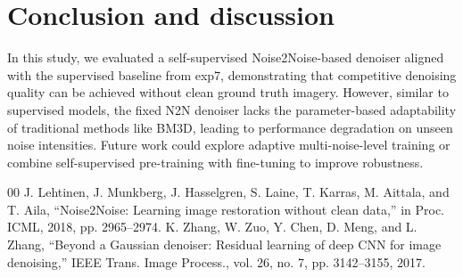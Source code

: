 \documentclass[conference]{IEEEtran}
\begin{document}
\section{Conclusion and discussion}
In this study, we evaluated a self-supervised Noise2Noise-based denoiser aligned with the supervised baseline from exp7, demonstrating that competitive denoising quality can be achieved without clean ground truth imagery. However, similar to supervised models, the fixed N2N denoiser lacks the parameter-based adaptability of traditional methods like BM3D, leading to performance degradation on unseen noise intensities. Future work could explore adaptive multi-noise-level training or combine self-supervised pre-training with fine-tuning to improve robustness.

\begin{thebibliography}{00}
 J. Lehtinen, J. Munkberg, J. Hasselgren, S. Laine, T. Karras, M. Aittala, and T. Aila, ``Noise2Noise: Learning image restoration without clean data,'' in Proc. ICML, 2018, pp. 2965--2974.
 K. Zhang, W. Zuo, Y. Chen, D. Meng, and L. Zhang, ``Beyond a Gaussian denoiser: Residual learning of deep CNN for image denoising,'' IEEE Trans. Image Process., vol. 26, no. 7, pp. 3142--3155, 2017.
\end{thebibliography}
\end{document}
